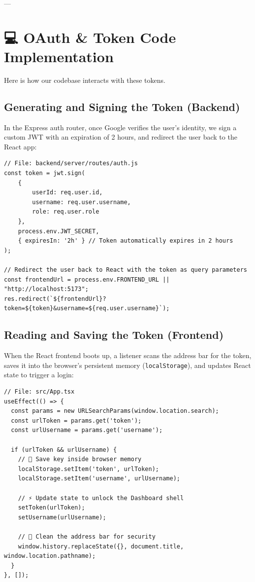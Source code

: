 \documentclass[11pt,a4paper]{article}
\begin{document}
---

\section{💻 OAuth \& Token Code Implementation}

Here is how our codebase interacts with these tokens.

\subsection{Generating and Signing the Token (Backend)}
In the Express auth router, once Google verifies the user's identity, we sign a custom JWT with an expiration of 2 hours, and redirect the user back to the React app:
\begin{lstlisting}
// File: backend/server/routes/auth.js
const token = jwt.sign(
    { 
        userId: req.user.id, 
        username: req.user.username, 
        role: req.user.role 
    },
    process.env.JWT_SECRET,
    { expiresIn: '2h' } // Token automatically expires in 2 hours
);

// Redirect the user back to React with the token as query parameters
const frontendUrl = process.env.FRONTEND_URL || "http://localhost:5173";
res.redirect(`${frontendUrl}?token=${token}&username=${req.user.username}`);
\end{lstlisting}

\subsection{Reading and Saving the Token (Frontend)}
When the React frontend boots up, a listener scans the address bar for the token, saves it into the browser's persistent memory (\texttt{localStorage}), and updates React state to trigger a login:
\begin{lstlisting}
// File: src/App.tsx
useEffect(() => {
  const params = new URLSearchParams(window.location.search);
  const urlToken = params.get('token');
  const urlUsername = params.get('username');

  if (urlToken && urlUsername) {
    // 💾 Save key inside browser memory
    localStorage.setItem('token', urlToken);
    localStorage.setItem('username', urlUsername);
    
    // ⚡ Update state to unlock the Dashboard shell
    setToken(urlToken);
    setUsername(urlUsername);

    // 🧹 Clean the address bar for security
    window.history.replaceState({}, document.title, window.location.pathname);
  }
}, []);
\end{lstlisting}
\end{document}
